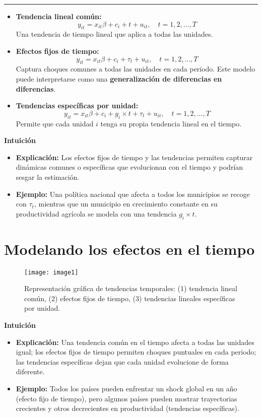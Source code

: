\documentclass[12pt]{article}
\begin{document}
\hrule

\begin{itemize}
    \item \textbf{Tendencia lineal común:}
    \[
    y_{it} = x_{it}\beta + c_i + t + u_{it}, \quad t=1,2,\ldots,T
    \]
    Una tendencia de tiempo lineal que aplica a todas las unidades.

    \item \textbf{Efectos fijos de tiempo:}
    \[
    y_{it} = x_{it}\beta + c_i + \tau_t + u_{it}, \quad t=1,2,\ldots,T
    \]
    Captura choques comunes a todas las unidades en cada periodo.  
    Este modelo puede interpretarse como una \textbf{generalización de diferencias en diferencias}.
    
    \item \textbf{Tendencias específicas por unidad:}
    \[
    y_{it} = x_{it}\beta + c_i + g_i \times t + \tau_t + u_{it}, \quad t=1,2,\ldots,T
    \]
    Permite que cada unidad $i$ tenga su propia tendencia lineal en el tiempo.
\end{itemize}

\noindent\textbf{Intuición}
\begin{itemize}
    \item \textbf{Explicación:} Los efectos fijos de tiempo y las tendencias permiten capturar dinámicas comunes o específicas que evolucionan con el tiempo y podrían sesgar la estimación.
    \item \textbf{Ejemplo:} Una política nacional que afecta a todos los municipios se recoge con $\tau_t$, mientras que un municipio en crecimiento constante en su productividad agrícola se modela con una tendencia $g_i \times t$.
\end{itemize}

\section*{\noindent\textbf{Modelando los efectos en el tiempo}}

\begin{figure}[H]
    \centering
    \texttt{[image: image1]}
    \caption{\footnotesize Representación gráfica de tendencias temporales: 
    (1) tendencia lineal común, 
    (2) efectos fijos de tiempo, 
    (3) tendencias lineales específicas por unidad.}
\end{figure}

\noindent\textbf{Intuición}
\begin{itemize}
    \item \textbf{Explicación:} Una tendencia común en el tiempo afecta a todas las unidades igual; los efectos fijos de tiempo permiten choques puntuales en cada periodo; las tendencias específicas dejan que cada unidad evolucione de forma diferente.
    \item \textbf{Ejemplo:} Todos los países pueden enfrentar un shock global en un año (efecto fijo de tiempo), pero algunos países pueden mostrar trayectorias crecientes y otros decrecientes en productividad (tendencias específicas).
\end{itemize}
\end{document}
